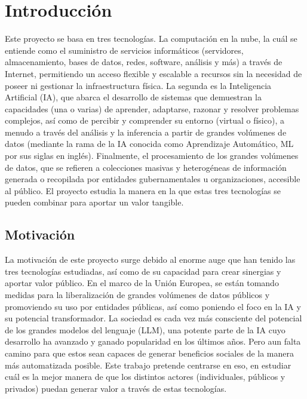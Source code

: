 \chapter{Introducción}
\label{cap:introduccion}


\vspace{1cm}

Este proyecto se basa en tres tecnologías. La computación en la nube, la cuál se entiende como el suministro de servicios informáticos (servidores, almacenamiento, bases de datos, redes, software, análisis y más) a través de Internet, permitiendo un acceso flexible y escalable a recursos sin la necesidad de poseer ni gestionar la infraestructura física. La segunda es la Inteligencia Artificial (IA), que abarca el desarrollo de sistemas que demuestran la capacidades (una o varias) de aprender, adaptarse, razonar y resolver problemas complejos, así como de percibir y comprender su entorno (virtual o físico), a menudo a través del análisis y la inferencia a partir de grandes volúmenes de datos (mediante la rama de la IA conocida como Aprendizaje Automático, ML por sus siglas en inglés). Finalmente, el procesamiento de los grandes volúmenes de datos, que se refieren a colecciones masivas y heterogéneas de información generada o recopilada por entidades gubernamentales u organizaciones, accesible al público. 
El proyecto estudia la manera en la que estas tres tecnologías se pueden combinar para aportar un valor tangible.

\section{Motivación}

La motivación de este proyecto surge debido al enorme auge que han tenido las tres tecnologías estudiadas, así como de su capacidad para crear sinergias y aportar valor público. En el marco de la Unión Europea, se están tomando medidas para la liberalización de grandes volúmenes de datos públicos y promoviendo su uso por entidades públicas, así como poniendo el foco en la IA y su potencial transformador. La sociedad es cada vez más consciente del potencial de los grandes modelos del lenguaje (LLM), una potente parte de la IA cuyo desarrollo ha avanzado y ganado popularidad en los últimos años. Pero aun falta camino para que estos sean capaces de generar beneficios sociales de la manera más automatizada posible. Este trabajo pretende centrarse en eso, en estudiar cuál es la mejor manera de que los distintos actores (individuales, públicos y privados) puedan generar valor a través de estas tecnologías.


